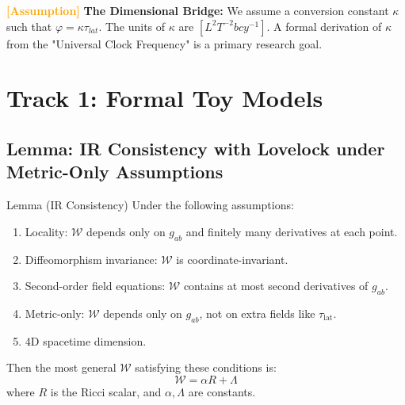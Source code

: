 \documentclass[11pt,titlepage]{article}
\newcommand{\tagass}{\textcolor{orange}{\textbf{[Assumption]}} }
\begin{document}
\tagass \textbf{The Dimensional Bridge:} We assume a conversion constant $\kappa$ such that $\varphi = \kappa \tau_{lat}$. The units of $\kappa$ are $[L^2 T^{-2} b cy^{-1}]$. A formal derivation of $\kappa$ from the "Universal Clock Frequency" is a primary research goal.

\section{Track 1: Formal Toy Models}


\subsection{Lemma: IR Consistency with Lovelock under Metric-Only Assumptions}

\begin{mytheorem}{Lemma (IR Consistency)}
\label{lemma:lovelock-consistency}
Under the following assumptions:
\begin{enumerate}
    \item Locality: $\mathcal{W}$ depends only on $g_{ab}$ and finitely many derivatives at each point.
    \item Diffeomorphism invariance: $\mathcal{W}$ is coordinate-invariant.
    \item Second-order field equations: $\mathcal{W}$ contains at most second derivatives of $g_{ab}$.
    \item Metric-only: $\mathcal{W}$ depends only on $g_{ab}$, not on extra fields like $\tau_{\mathrm{lat}}$.
    \item 4D spacetime dimension.
\end{enumerate}
Then the most general $\mathcal{W}$ satisfying these conditions is:
\begin{equation}
\mathcal{W} = \alpha R + \Lambda
\end{equation}
where $R$ is the Ricci scalar, and $\alpha, \Lambda$ are constants.
\end{mytheorem}
\end{document}
